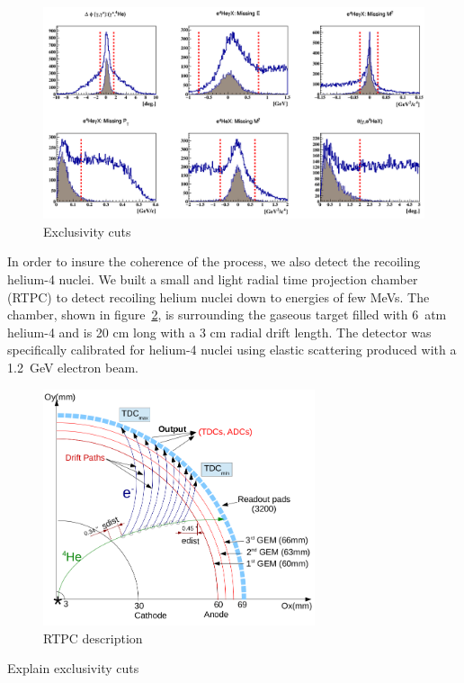 \documentclass[%
 reprint,
 amsmath,amssymb,
 aps,
]{revtex4-1}
\begin{document}
\begin{figure}[tbp]
\caption{\label{fig:exclu} Exclusivity cuts}
\includegraphics[width=17.2cm]{all_coh_exc_cuts.png}
\end{figure}

In order to insure the coherence of the process, we also detect the recoiling 
helium-4 nuclei. We built a small and light radial time projection chamber 
(RTPC) to detect recoiling helium nuclei down to energies of few MeVs. The 
chamber, shown in figure~\ref{fig:rtpc}, is surrounding the gaseous target 
filled with 6~atm helium-4 and is 20 cm long with a 3 cm radial drift 
length. The detector was specifically calibrated for helium-4 nuclei using 
elastic scattering produced with a 1.2~GeV electron beam.

\begin{figure}[htbp]
\caption{\label{fig:rtpc} RTPC description}
\includegraphics[width=8cm]{RTPC.png}
\end{figure}

Explain exclusivity cuts
\end{document}
